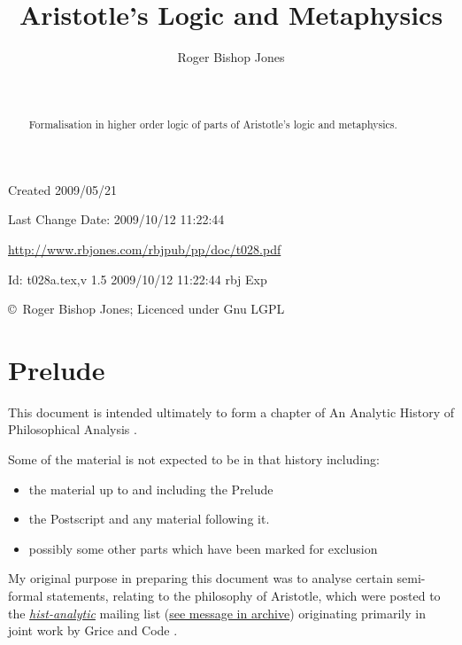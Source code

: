 \documentclass[11pt]{article}
\title{Aristotle's Logic and Metaphysics}
\author{Roger Bishop Jones}
\date{\ }
\begin{document}
\begin{titlepage}
\maketitle
\begin{abstract}
Formalisation in higher order logic of parts of Aristotle's logic and metaphysics.
\end{abstract}
\vfill

\begin{centering}
{\footnotesize

Created 2009/05/21

Last Change $ $Date: 2009/10/12 11:22:44 $ $

\href{http://www.rbjones.com/rbjpub/pp/doc/t028.pdf}
{http://www.rbjones.com/rbjpub/pp/doc/t028.pdf}

$ $Id: t028a.tex,v 1.5 2009/10/12 11:22:44 rbj Exp $ $

\copyright\ Roger Bishop Jones; Licenced under Gnu LGPL

}%
\end{centering}

\thispagestyle{empty}
\end{titlepage}

\newpage
\addtocounter{page}{1}
{\parskip=0pt\tableofcontents}

\section{Prelude}

This document is intended ultimately to form a chapter of An Analytic History of Philosophical Analysis \cite{rbjb001}.

Some of the material is not expected to be in that history including:
\begin{itemize}
\item the material up to and including the Prelude
\item the Postscript and any material following it.
\item possibly some other parts which have been marked for exclusion
\end{itemize}

My original purpose in preparing this document was to analyse certain semi-formal statements, relating to the philosophy of Aristotle, which were posted to the \href{http://hist-analytic.org}{\it hist-analytic} mailing list (\href{http://rbjones.com/pipermail/hist-analytic_rbjones.com/2009q2/000258.html}{see message in archive}) originating primarily in joint work by Grice \cite{grice88} and Code \cite{code88}.
\end{document}

